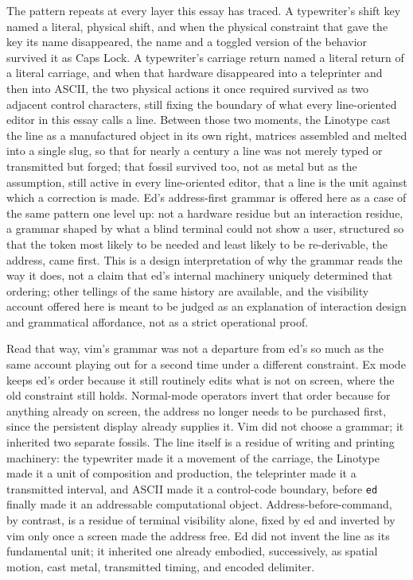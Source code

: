 \documentclass[11pt]{article}
\begin{document}
The pattern repeats at every layer this essay has traced. A typewriter's shift key named a literal, physical shift, and when the physical constraint that gave the key its name disappeared, the name and a toggled version of the behavior survived it as Caps Lock. A typewriter's carriage return named a literal return of a literal carriage, and when that hardware disappeared into a teleprinter and then into ASCII, the two physical actions it once required survived as two adjacent control characters, still fixing the boundary of what every line-oriented editor in this essay calls a line. Between those two moments, the Linotype cast the line as a manufactured object in its own right, matrices assembled and melted into a single slug, so that for nearly a century a line was not merely typed or transmitted but forged; that fossil survived too, not as metal but as the assumption, still active in every line-oriented editor, that a line is the unit against which a correction is made. Ed's address-first grammar is offered here as a case of the same pattern one level up: not a hardware residue but an interaction residue, a grammar shaped by what a blind terminal could not show a user, structured so that the token most likely to be needed and least likely to be re-derivable, the address, came first. This is a design interpretation of why the grammar reads the way it does, not a claim that ed's internal machinery uniquely determined that ordering; other tellings of the same history are available, and the visibility account offered here is meant to be judged as an explanation of interaction design and grammatical affordance, not as a strict operational proof.

Read that way, vim's grammar was not a departure from ed's so much as the same account playing out for a second time under a different constraint. Ex mode keeps ed's order because it still routinely edits what is not on screen, where the old constraint still holds. Normal-mode operators invert that order because for anything already on screen, the address no longer needs to be purchased first, since the persistent display already supplies it. Vim did not choose a grammar; it inherited two separate fossils. The line itself is a residue of writing and printing machinery: the typewriter made it a movement of the carriage, the Linotype made it a unit of composition and production, the teleprinter made it a transmitted interval, and ASCII made it a control-code boundary, before \texttt{ed} finally made it an addressable computational object. Address-before-command, by contrast, is a residue of terminal visibility alone, fixed by ed and inverted by vim only once a screen made the address free. Ed did not invent the line as its fundamental unit; it inherited one already embodied, successively, as spatial motion, cast metal, transmitted timing, and encoded delimiter.
\end{document}
